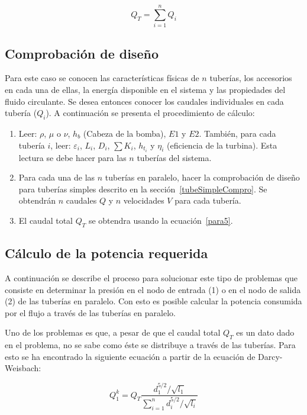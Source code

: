 \documentclass[11pt, oneside]{article}
\begin{document}
\begin{equation}
Q_T = \sum_{i=1}^n Q_i
\label{para5}
\end{equation}

\subsection{Comprobaci\'on de dise\~no} 
Para este caso se conocen las caracter\'isticas f\'isicas de $n$ tuber\'ias, los accesorios en cada una de ellas, la energ\'ia disponible en el sistema y las propiedades del fluido circulante. Se desea entonces conocer los caudales individuales en cada tuber\'ia ($Q_i$). A continuaci\'on se presenta el procedimiento de c\'alculo: 
\begin{enumerate}
\item Leer: $\rho$, $\mu$ o $\nu$, $h_{b}$ (Cabeza de la bomba), $E1$ y $E2$. Tambi\'en, para cada tuber\'ia $i$, leer: $\varepsilon_i$, $L_i$, $D_i$, $\sum K_i$, $h_{t_i}$ y $\eta_i$ (eficiencia de la turbina). Esta lectura se debe hacer para las $n$ tuber\'ias del sistema.
\item Para cada una de las $n$ tuber\'ias en paralelo, hacer la comprobaci\'on de dise\~no para tuber\'ias simples descrito en la secci\'on~\ref{tubeSimpleCompro}. Se obtendr\'an $n$ caudales $Q$ y $n$ velocidades $V$ para cada tuber\'ia. 
\item El caudal total $Q_T$ se obtendra usando la ecuaci\'on~\ref{para5}. 
\end{enumerate}

\subsection{C\'alculo de la potencia requerida}\label{tubeParallPoten}
A continuaci\'on se describe el proceso para solucionar este tipo de problemas que consiste en determinar la presi\'on en el nodo de entrada (1) o en el nodo de salida (2) de las tuber\'ias en paralelo. Con esto es posible calcular la potencia consumida por el flujo a trav\'es de las tuber\'ias en paralelo. 

Uno de los problemas es que, a pesar de que el caudal total $Q_T$ es un dato dado en el problema, no se sabe como \'este se distribuye a trav\'es de las tuber\'ias. Para esto se ha encontrado la siguiente ecuaci\'on a partir de la ecuaci\'on de Darcy-Weisbach:

\begin{equation}
Q_1^k = Q_T \frac{d_1^{5/2} / \sqrt{l_1}}{\sum_{i=1}^n d_i^{5/2} / \sqrt{l_i}}
\label{para6}
\end{equation}
\end{document}
